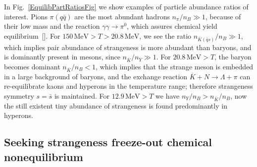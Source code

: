 In Fig.~\ref{EquilibPartRatiosFig} we show examples of particle abundance ratios of interest. %
Pions $\pi(q\bar q)$ are the most abundant hadrons $n_\pi/n_B\gg1$, because of their low mass and the reaction $\gamma\gamma\rightarrow\pi^0$, which assures chemical yield equilibrium~[\cite{Kuznetsova:2008jt}]. For $150\,\mathrm{MeV}>T>20.8\,\mathrm{MeV}$, we see the ratio $n_{{\overline K}(\bar q s)}/n_B\gg1$, which implies pair abundance of strangeness is more abundant than baryons, and is dominantly present in mesons, since $n_{\overline K}/n_Y\gg1$. 
For $20.8\,\mathrm{MeV}>T$, the baryon becomes dominant $n_{\overline K}/n_B<1$, which implies that the strange meson is embedded in a large background of baryons, and the exchange reaction $\overline{K}+N\rightarrow \Lambda+\pi$ can re-equilibrate kaons and hyperons in the temperature range; therefore strangeness symmetry $s=\bar s$ is maintained. For $12.9\,\mathrm{MeV}>T$ we have $n_Y/n_B>n_{\overline K}/n_B$, now the still existent tiny abundance of strangeness is found predominantly in hyperons.




\subsection{Seeking strangeness freeze-out chemical nonequilibrium
}


